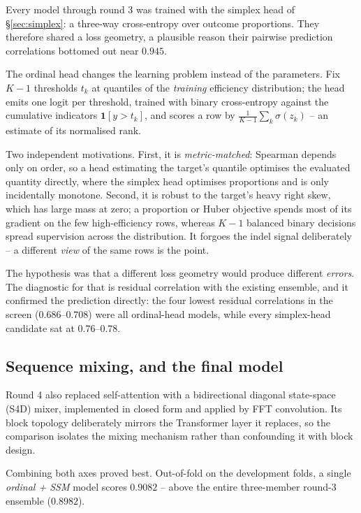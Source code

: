 \documentclass[11pt]{article}
\begin{document}
Every model through round 3 was trained with the simplex head of
\S\ref{sec:simplex}: a three-way cross-entropy over outcome proportions. They
therefore shared a loss geometry, a plausible reason their pairwise prediction
correlations bottomed out near $0.945$.

The ordinal head changes the learning problem instead of the parameters. Fix
$K-1$ thresholds $t_k$ at quantiles of the \emph{training} efficiency
distribution; the head emits one logit per threshold, trained with binary
cross-entropy against the cumulative indicators $\mathbf{1}[y>t_k]$, and scores a
row by $\frac{1}{K-1}\sum_k \sigma(z_k)$ -- an estimate of its normalised rank.

Two independent motivations. First, it is \emph{metric-matched}: Spearman depends
only on order, so a head estimating the target's quantile optimises the evaluated
quantity directly, where the simplex head optimises proportions and is only
incidentally monotone. Second, it is robust to the target's heavy right skew,
which has large mass at zero; a proportion or Huber objective spends most of its
gradient on the few high-efficiency rows, whereas $K-1$ balanced binary decisions
spread supervision across the distribution. It forgoes the indel signal
deliberately -- a different \emph{view} of the same rows is the point.

The hypothesis was that a different loss geometry would produce different
\emph{errors}. The diagnostic for that is residual correlation with the existing
ensemble, and it confirmed the prediction directly: the four lowest residual
correlations in the screen ($0.686$--$0.708$) were all ordinal-head models, while
every simplex-head candidate sat at $0.76$--$0.78$.

\subsection{Sequence mixing, and the final model}

Round 4 also replaced self-attention with a bidirectional diagonal state-space
(S4D) mixer, implemented in closed form and applied by FFT convolution. Its block
topology deliberately mirrors the Transformer layer it replaces, so the comparison
isolates the mixing mechanism rather than confounding it with block design.

Combining both axes proved best. Out-of-fold on the development folds, a single
\emph{ordinal + SSM} model scores $0.9082$ -- above the entire three-member
round-3 ensemble ($0.8982$).
\end{document}
